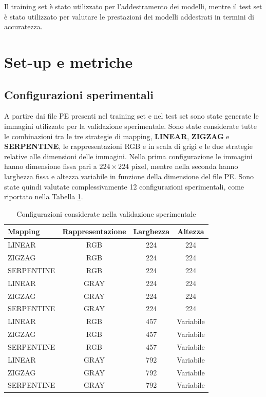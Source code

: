 Il training set è stato utilizzato per l'addestramento dei modelli,
mentre il test set è stato utilizzato per valutare le prestazioni dei modelli addestrati in termini di accuratezza.

\section{Set-up e metriche}

\subsection{Configurazioni sperimentali}

A partire dai file PE presenti nel training set e nel test set sono
state generate le immagini utilizzate per la validazione sperimentale.
Sono state considerate tutte le combinazioni tra le tre strategie di
mapping, \textbf{LINEAR}, \textbf{ZIGZAG} e \textbf{SERPENTINE}, le
rappresentazioni RGB e in scala di grigi e le due strategie
relative alle dimensioni delle immagini. Nella prima configurazione
le immagini hanno dimensione fissa pari a $224 \times 224$ pixel,
mentre nella seconda hanno larghezza fissa e altezza variabile in
funzione della dimensione del file PE. Sono state quindi valutate
complessivamente 12 configurazioni sperimentali, come riportato nella
Tabella \ref{tab:configurazioni_sperimentali}.

\begin{table}[H]
    \centering
    \caption{Configurazioni considerate nella validazione sperimentale}
    \label{tab:configurazioni_sperimentali}
    \renewcommand{\arraystretch}{1.3}
    \begin{tabular}{lccc}
        \toprule
        \textbf{Mapping} & \textbf{Rappresentazione}
        & \textbf{Larghezza} & \textbf{Altezza} \\
        \midrule
        LINEAR     & RGB  & 224 & 224 \\
        ZIGZAG     & RGB  & 224 & 224 \\
        SERPENTINE & RGB  & 224 & 224 \\
        \midrule
        LINEAR     & GRAY & 224 & 224 \\
        ZIGZAG     & GRAY & 224 & 224 \\
        SERPENTINE & GRAY & 224 & 224 \\
        \midrule
        LINEAR     & RGB  & 457 & Variabile \\
        ZIGZAG     & RGB  & 457 & Variabile \\
        SERPENTINE & RGB  & 457 & Variabile \\
        \midrule
        LINEAR     & GRAY & 792 & Variabile \\
        ZIGZAG     & GRAY & 792 & Variabile \\
        SERPENTINE & GRAY & 792 & Variabile \\
        \bottomrule
    \end{tabular}
\end{table}

